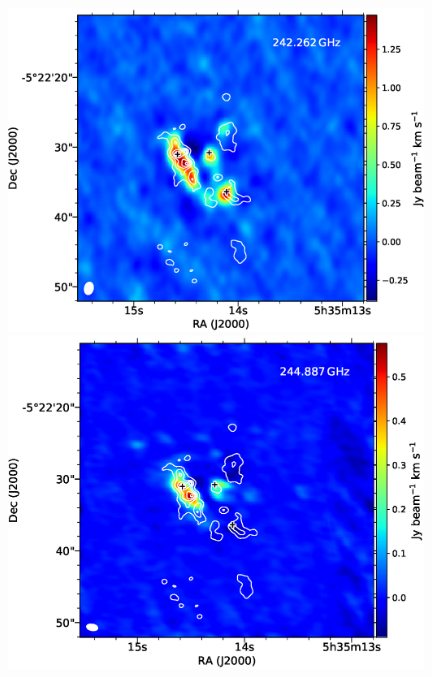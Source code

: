 \begin{figure}[H]
\begin{center}
\begin{minipage}{0.98\textwidth} 
\begin{center}
\begin{minipage}{0.48\textwidth}
\begin{center}
\includegraphics[width=0.98\textwidth]{OrionKL/mom0/242.262SV_mom0_3-7.eps}
\end{center}
\end{minipage}
\begin{minipage}{0.48\textwidth}
\begin{center}
\includegraphics[width=0.98\textwidth]{OrionKL/mom0/244.887mom0_3-7.eps}
\end{center}
\end{minipage}
\end{center}
\end{minipage}


\end{center}
\end{figure}
